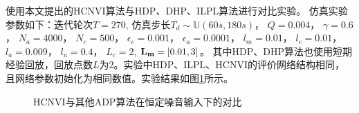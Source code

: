 使用本文提出的HCNVI算法与HDP、DHP、ILPL算法进行对比实验。
仿真实验参数如下：迭代轮次$T=270$, 仿真步长$T_d\sim \mathbb{U}(60s, 180s)$， $Q=0.004$，
$\gamma=0.6$， $N_a=4000$， $N_c=500$， $\epsilon _c=0.001$，
$\epsilon _a=0.0001$， $l_m=0.01$， $l_c=0.01$， $l_a=0.009$，
$l_u=0.4$， $L_c=2$, $\mathbf {L_m}=[0.01,3]$。
其中HDP、DHP算法也使用短期经验回放，回放点数$L$为2。实验中HDP、ILPL、HCNVI的评价网络结构相同，且网络参数初始化为相同数值。实验结果如图\ref{fig:HCNVI_HDP}所示。
\begin{figure}[!ht]
\centering \subfigure{\label{fig:concentraion_out_exp1}}
{} \centering
 \subfigure{\label{fig:cost_exp1}}
{}
    \caption{HCNVI与其他ADP算法在恒定噪音输入下的对比}
  \addtocounter{figure}{-1}
  \vspace{-5pt}
  \renewcommand{\figurename}{图}
    \label{fig:HCNVI_HDP}
\end{figure}



